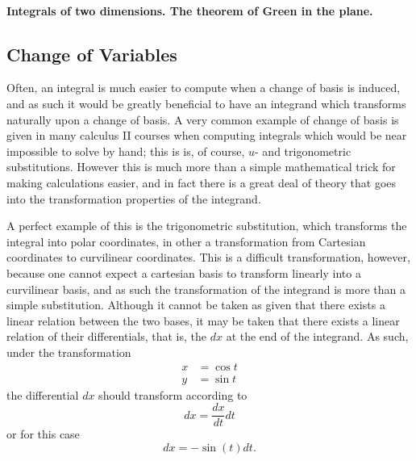 \documentclass[.../main.tex]{subfiles}
\begin{document}
\paragraph*{Integrals of two dimensions. The theorem of Green in the plane.}



\subsection{Change of Variables}
Often, an integral is much easier to compute when a change of basis is induced, and as such it would be greatly beneficial to have an integrand which transforms naturally upon a change of basis. A very common example of change of basis is given in many calculus II courses when computing integrals which would be near impossible to solve by hand; this is is, of course, $u$- and trigonometric substitutions. However this is much more than a simple mathematical trick for making calculations easier, and in fact there is a great deal of theory that goes into the transformation properties of the integrand.

A perfect example of this is the trigonometric substitution, which transforms the integral into polar coordinates, in other a transformation from Cartesian coordinates to curvilinear coordinates. This is a difficult transformation, however, because one cannot expect a cartesian basis to transform linearly into a curvilinear basis, and as such the transformation of the integrand is more than a simple substitution. Although it cannot be taken as given that there exists a linear relation between the two bases, it may be taken that there exists a linear relation of their differentials, that is, the $dx$ at the end of the integrand. As such, under the transformation 
\begin{equation}
	\begin{split}
		x &= \cos{t} \\
		y &= \sin{t}
	\end{split}
	\label{eq: 2.4}
\end{equation}
the differential $dx$ should transform according to\footnotemark
\begin{equation}
	dx = \frac{dx}{dt} dt
	\label{eq: 2.5}
\end{equation}
or for this case
\begin{equation}
	dx = -\sin{(t)} dt.
	\label{eq: 2.6}
\end{equation}
\end{document}
